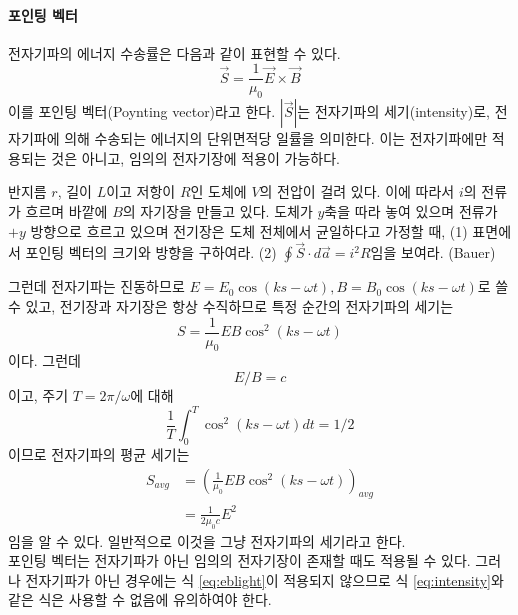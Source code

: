 \paragraph{포인팅 벡터}
전자기파의 에너지 수송률은 다음과 같이 표현할 수 있다.
\begin{equation}
\vec{S}=\frac{1}{\mu_0}\vec{E}\times\vec{B}
\end{equation}
이를 포인팅 벡터(Poynting vector)라고 한다. $|\vec{S}|$는 전자기파의 세기(intensity)로, 전자기파에 의해 수송되는 에너지의 단위면적당 일률을 의미한다.  이는 전자기파에만 적용되는 것은 아니고, 임의의 전자기장에 적용이 가능하다.

\begin{exercise}
반지름 $r$, 길이 $L$이고 저항이 $R$인 도체에 $V$의 전압이 걸려 있다. 이에 따라서 $i$의 전류가 흐르며 바깥에 $B$의 자기장을 만들고 있다. 도체가 $y$축을 따라 놓여 있으며 전류가 $+y$ 방향으로 흐르고 있으며 전기장은 도체 전체에서 균일하다고 가정할 때, (1) 표면에서 포인팅 벡터의 크기와 방향을 구하여라. (2) $\oint \vec{S}\cdot d\vec{a}=i^2R$임을 보여라. (Bauer)
\end{exercise}


그런데 전자기파는 진동하므로 $E=E_0\cos(ks-\omega t), B=B_0\cos(ks-\omega t)$로 쓸 수 있고, 전기장과 자기장은 항상 수직하므로 특정 순간의 전자기파의 세기는 
\begin{equation}
S=\frac{1}{\mu_0}EB\cos^2(ks-\omega t)
\end{equation}
이다. 그런데
\begin{equation}\label{eq:eblight}
E/B=c
\end{equation}
이고, 주기 $T=2\pi/\omega$에 대해
\begin{equation}
\frac{1}{T}\int_0^{T} \cos^2(ks-\omega t)dt=1/2
\end{equation}
이므로 전자기파의 평균 세기는
\begin{align}
S_{avg}&=\left ( \frac{1}{\mu_0}EB\cos^2(ks-\omega t)\right )_{avg}\\
&= \frac{1}{2\mu_0 c}E^2 \label{eq:intensity}
\end{align}
임을 알 수 있다. 일반적으로 이것을 그냥 전자기파의 세기라고 한다.\\
포인팅 벡터는 전자기파가 아닌 임의의 전자기장이 존재할 때도 적용될 수 있다. 그러나 전자기파가 아닌 경우에는 식 \ref{eq:eblight}이 적용되지 않으므로 식 \ref{eq:intensity}와 같은 식은 사용할 수 없음에 유의하여야 한다. 
